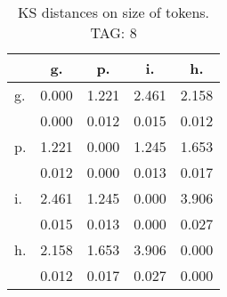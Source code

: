 \begin{table}[h!]
\begin{center}
\begin{tabular}{| l | c | c | c | c |}\hline
 & g. & p. & i. & h. \\\hline
g. & 0.000  & 1.221  & 2.461  & 2.158 \\\hline
 & 0.000  & 0.012  & 0.015  & 0.012 \\\hline
p. & 1.221  & 0.000  & 1.245  & 1.653 \\\hline
 & 0.012  & 0.000  & 0.013  & 0.017 \\\hline
i. & 2.461  & 1.245  & 0.000  & 3.906 \\\hline
 & 0.015  & 0.013  & 0.000  & 0.027 \\\hline
h. & 2.158  & 1.653  & 3.906  & 0.000 \\\hline
 & 0.012  & 0.017  & 0.027  & 0.000 \\\hline
\end{tabular}
\caption{KS distances on size of tokens. TAG: 8}
\end{center}
\end{table}